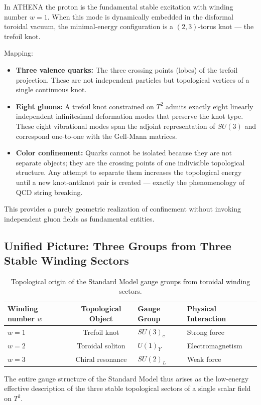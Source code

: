 \documentclass[11pt,a4paper]{article}
\begin{document}
In ATHENA the proton is the fundamental stable excitation with winding number \(w = 1\). When this mode is dynamically embedded in the disformal toroidal vacuum, the minimal-energy configuration is a \((2,3)\)-torus knot — the trefoil knot.

Mapping:
\begin{itemize}
\item \textbf{Three valence quarks:} The three crossing points (lobes) of the trefoil projection. These are not independent particles but topological vertices of a single continuous knot.
\item \textbf{Eight gluons:} A trefoil knot constrained on \(T^2\) admits exactly eight linearly independent infinitesimal deformation modes that preserve the knot type. These eight vibrational modes span the adjoint representation of \(SU(3)\) and correspond one-to-one with the Gell-Mann matrices.
\item \textbf{Color confinement:} Quarks cannot be isolated because they are not separate objects; they are the crossing points of one indivisible topological structure. Any attempt to separate them increases the topological energy until a new knot-antiknot pair is created — exactly the phenomenology of QCD string breaking.
\end{itemize}
This provides a purely geometric realization of confinement without invoking independent gluon fields as fundamental entities.

\subsection{Unified Picture: Three Groups from Three Stable Winding Sectors}

\begin{table}[H]
\centering
\caption{Topological origin of the Standard Model gauge groups from toroidal winding sectors.}
\begin{tabular}{lcll}
\toprule
Winding number \(w\) & Topological Object & Gauge Group & Physical Interaction \\
\midrule
\(w=1\) & Trefoil knot & \(SU(3)_c\) & Strong force \\
\(w=2\) & Toroidal soliton & \(U(1)_Y\) & Electromagnetism \\
\(w=3\) & Chiral resonance & \(SU(2)_L\) & Weak force \\
\bottomrule
\end{tabular}
\end{table}

The entire gauge structure of the Standard Model thus arises as the low-energy effective description of the three stable topological sectors of a single scalar field on \(T^2\).
\end{document}
